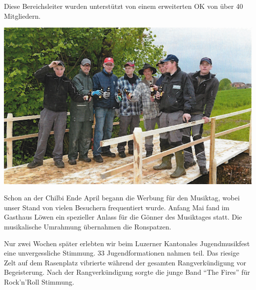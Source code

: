 \begin{history}
    Diese Bereichsleiter wurden unterstützt von einem erweiterten OK von über 40
    Mitgliedern.

    \begin{MulticolFigure}
        \centering
        \includegraphics[width=0.93\linewidth]{./chap/2001-2024/2013/Bau-Marschmusikstrecke.jpg}
    \end{MulticolFigure}

    Schon an der Chilbi Ende April begann die Werbung für den Musiktag, wobei
    unser Stand von vielen Besuchern frequentiert wurde. Anfang Mai fand im
    Gasthaus Löwen ein spezieller Anlass für die Gönner des Musiktages statt.
    Die musikalische Umrahmung übernahmen die Ronspatzen.

    Nur zwei Wochen später erlebten wir beim Luzerner Kantonales Jugendmusikfest
    eine unvergessliche Stimmung. 33 Jugendformationen nahmen teil. Das riesige
    Zelt auf dem Rasenplatz vibrierte während der gesamten Rangverkündigung vor
    Begeisterung.    Nach der Rangverkündigung sorgte die junge Band
    \enquote{The Fires} für Rock'n'Roll Stimmung.


\end{history}
